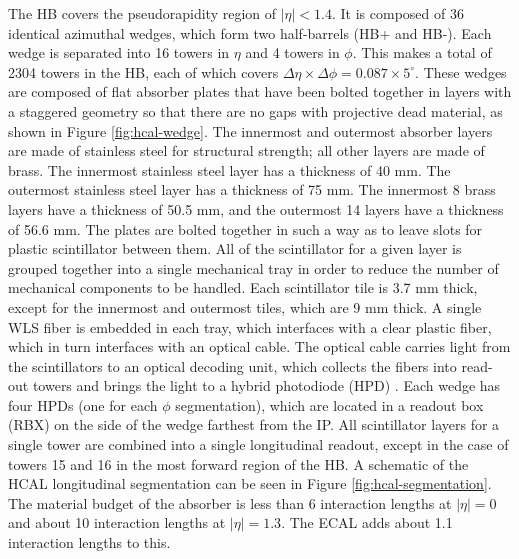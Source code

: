 The HB covers the pseudorapidity region of $|\eta| < 1.4$.
It is composed of 36 identical azimuthal wedges, which 
form two half-barrels (HB+ and HB-).  
Each wedge is separated into 16 towers in $\eta$ and 4 towers
in $\phi$.  This makes a total of 2304 towers in the HB, each
of which covers $\Delta\eta\times\Delta\phi = 0.087\times5^{\circ}$.
These wedges are composed of flat absorber plates that have been bolted together in layers with a staggered
geometry so that there are no gaps with projective dead material, as shown in Figure \ref{fig:hcal-wedge}.
The innermost and outermost absorber layers are made of stainless steel for structural
strength; all other layers are made of brass.  The innermost stainless steel layer has a thickness
of 40 mm.  The outermost stainless steel layer has a thickness of 75 mm.  The innermost
8 brass layers have a thickness of 50.5 mm, and the outermost 14 layers have a thickness
of 56.6 mm.  The plates are bolted together in such a way as to leave
slots for plastic scintillator between them.
All of the scintillator for a given layer is grouped together into a single mechanical tray 
in order to reduce the number of mechanical components to be handled.
Each scintillator tile is 3.7 mm thick, except for the innermost and outermost tiles, which are 9 mm thick.
A single WLS fiber is embedded in each tray, which interfaces 
with a clear plastic fiber, which in turn interfaces with an optical cable.
The optical cable carries light from the scintillators to an optical decoding unit, 
which collects the fibers into read-out towers and brings the light 
to a hybrid photodiode (HPD) .
Each wedge has four HPDs (one for each $\phi$ segmentation), which are located
in a readout box (RBX)  on the side of the wedge 
farthest from the IP.  All scintillator layers for a single tower 
are combined into a single longitudinal readout, except in the case of 
towers 15 and 16 in the most forward region of the HB.  A schematic of the HCAL
longitudinal segmentation can be seen in Figure \ref{fig:hcal-segmentation}.
The material budget of the absorber is less than 6 interaction lengths at 
$|\eta| = 0$ and about 10 interaction lengths at $|\eta| = 1.3$. The ECAL
adds about 1.1 interaction lengths to this.

